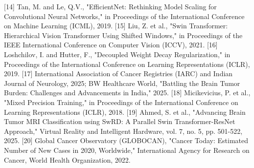 \documentclass[12pt,a4paper,oneside]{report}
\begin{document}
[14] Tan, M. and Le, Q.V., "EfficientNet: Rethinking Model Scaling for Convolutional Neural Networks," in Proceedings of the International Conference on Machine Learning (ICML), 2019.
[15] Liu, Z. et al., "Swin Transformer: Hierarchical Vision Transformer Using Shifted Windows," in Proceedings of the IEEE International Conference on Computer Vision (ICCV), 2021.
[16] Loshchilov, I. and Hutter, F., "Decoupled Weight Decay Regularization," in Proceedings of the International Conference on Learning Representations (ICLR), 2019.
[17] International Association of Cancer Registries (IARC) and Indian Journal of Neurology, 2025; BW Healthcare World, "Battling the Brain Tumor Burden: Challenges and Advancements in India," 2025.
[18] Micikevicius, P. et al., "Mixed Precision Training," in Proceedings of the International Conference on Learning Representations (ICLR), 2018.
[19] Ahmed, S. et al., "Advancing Brain Tumor MRI Classification using SwRD: A Parallel Swin Transformer-ResNet Approach," Virtual Reality and Intelligent Hardware, vol. 7, no. 5, pp. 501-522, 2025.
[20] Global Cancer Observatory (GLOBOCAN), "Cancer Today: Estimated Number of New Cases in 2020, Worldwide," International Agency for Research on Cancer, World Health Organization, 2022.
\end{document}
